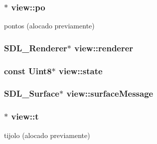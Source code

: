 \subsubsection[{\texorpdfstring{po}{po}}]{$\ast$ view\+::po\hspace{0.3cm}{\ttfamily [private]}}\hypertarget{classview_a8dc345a9799a79220ecca66c4cd3e8ff}{}\label{classview_a8dc345a9799a79220ecca66c4cd3e8ff}
pontos (alocado previamente) 
\subsubsection[{\texorpdfstring{renderer}{renderer}}]{\setlength{\rightskip}{0pt plus 5cm}S\+D\+L\+\_\+\+Renderer$\ast$ view\+::renderer\hspace{0.3cm}{\ttfamily [private]}}\hypertarget{classview_a8d7b3ec0a0641d24cdc3b04949f5df45}{}\label{classview_a8d7b3ec0a0641d24cdc3b04949f5df45}
\subsubsection[{\texorpdfstring{state}{state}}]{\setlength{\rightskip}{0pt plus 5cm}const Uint8$\ast$ view\+::state\hspace{0.3cm}{\ttfamily [private]}}\hypertarget{classview_a6fd7fc350d9ad94dfd47e324b107e8ce}{}\label{classview_a6fd7fc350d9ad94dfd47e324b107e8ce}
\subsubsection[{\texorpdfstring{surface\+Message}{surfaceMessage}}]{\setlength{\rightskip}{0pt plus 5cm}S\+D\+L\+\_\+\+Surface$\ast$ view\+::surface\+Message\hspace{0.3cm}{\ttfamily [private]}}\hypertarget{classview_a33f594a367a3616507115acc1f88c9ae}{}\label{classview_a33f594a367a3616507115acc1f88c9ae}
\subsubsection[{\texorpdfstring{t}{t}}]{$\ast$ view\+::t\hspace{0.3cm}{\ttfamily [private]}}\hypertarget{classview_a952fdfafefca2c0bfc8b17647a5706be}{}\label{classview_a952fdfafefca2c0bfc8b17647a5706be}
tijolo (alocado previamente) 
